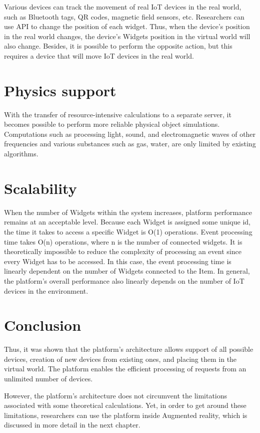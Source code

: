 Various devices can track the movement of real IoT devices in the real world, such as Bluetooth tags, QR codes, magnetic field sensors, etc. Researchers can use API to change the position of each widget. Thus, when the device's position in the real world changes, the device's Widgets position in the virtual world will also change. Besides, it is possible to perform the opposite action, but this requires a device that will move IoT devices in the real world.

\section{Physics support}

With the transfer of resource-intensive calculations to a separate server, it becomes possible to perform more reliable physical object simulations. Computations such as processing light, sound, and electromagnetic waves of other frequencies and various substances such as gas, water, are only limited by existing algorithms.

\section{Scalability}

When the number of Widgets within the system increases, platform performance remains at an acceptable level. Because each Widget is assigned some unique id, the time it takes to access a specific Widget is O(1) operations. Event processing time takes O(n) operations, where n is the number of connected widgets. It is theoretically impossible to reduce the complexity of processing an event since every Widget has to be accessed. In this case, the event processing time is linearly dependent on the number of Widgets connected to the Item. In general, the platform's overall performance also linearly depends on the number of IoT devices in the environment.

\section{Conclusion}

Thus, it was shown that the platform's architecture allows support of all possible devices, creation of new devices from existing ones, and placing them in the virtual world. The platform enables the efficient processing of requests from an unlimited number of devices.

However, the platform's architecture does not circumvent the limitations associated with some theoretical calculations. Yet, in order to get around these limitations, researchers can use the platform inside Augmented reality, which is discussed in more detail in the next chapter.